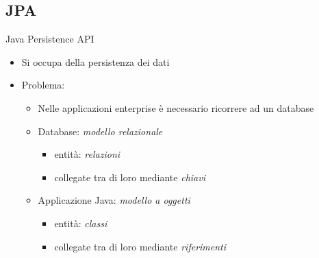 \subsection{JPA}
\begin{frame}{Java Persistence API}

\begin{itemize}
\item Si occupa della persistenza dei dati
\end{itemize}

\vspace{0.4em}

\begin{itemize}
\item Problema:

	\begin{itemize}
	
	\vspace{0.4em}

	\item Nelle applicazioni enterprise è necessario ricorrere ad un database
	
	\vspace{0.7em}
	
	\item Database: \textsl{modello relazionale}
		\begin{itemize}
		
		\vspace{0.4em}
		
		\item entità: \textsl{relazioni}
		
		\vspace{0.2em}
		
		\item collegate tra di loro mediante \textsl{chiavi}
		\end{itemize}
		
	\vspace{0.7em}
	
	\item Applicazione Java: \textsl{modello a oggetti}
		\begin{itemize}
		
		\vspace{0.4em}
		
		\item entità: \textsl{classi}
		
		\vspace{0.2em}
		
		\item collegate tra di loro mediante \textsl{riferimenti}
		\end{itemize}
	
	\end{itemize}

\end{itemize}

\end{frame}


